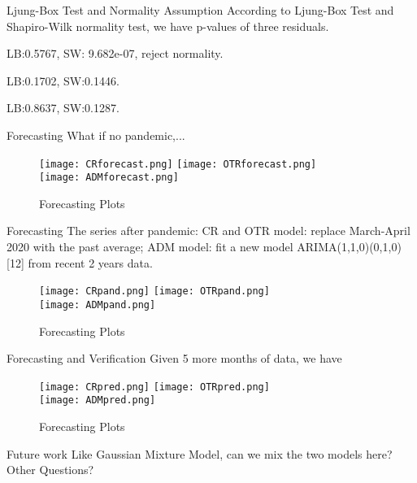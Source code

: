 \documentclass[11pt]{beamer}
\begin{document}
\begin{frame} {Ljung-Box Test and Normality Assumption}
According to Ljung-Box Test and Shapiro-Wilk normality test, we have p-values of three residuals.
\begin{description}
\item[CR series] LB:0.5767, SW: 9.682e-07, reject normality.
\item[OTR series] LB:0.1702, SW:0.1446.
\item[ADM series] LB:0.8637, SW:0.1287.
\end{description}
\end{frame}

\begin{frame} {Forecasting}
What if no pandemic,...
\begin{figure}
\texttt{[image: CRforecast.png]} 
\texttt{[image: OTRforecast.png]} \\
\texttt{[image: ADMforecast.png]} 
\caption{Forecasting Plots}
\end{figure}
\end{frame}

\begin{frame} {Forecasting}
The series after pandemic: CR and OTR model: replace March-April 2020 with the past average; ADM model: fit a new model ARIMA(1,1,0)(0,1,0)[12] from recent 2 years data.
\begin{figure}
\texttt{[image: CRpand.png]} 
\texttt{[image: OTRpand.png]} \\
\texttt{[image: ADMpand.png]} 
\caption{Forecasting Plots}
\end{figure}
\end{frame}

\begin{frame} {Forecasting and Verification}
Given 5 more months of data, we have
\begin{figure}
\texttt{[image: CRpred.png]} 
\texttt{[image: OTRpred.png]} \\
\texttt{[image: ADMpred.png]} 
\caption{Forecasting Plots}
\end{figure}
\end{frame}

\begin{frame} {Future work}
\center
Like Gaussian Mixture Model, can we mix the two models here? \\
\large
Other Questions?
\end{frame}
\end{document}
